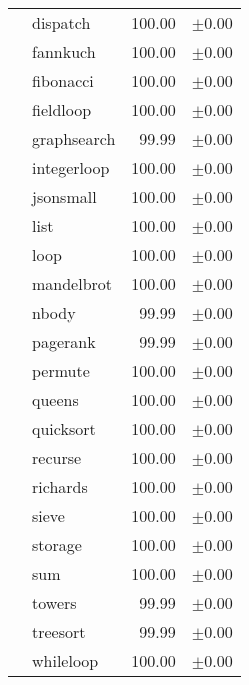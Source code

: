 \begin{tabular}{ll@{\hspace{6pt}}r@{\hspace{3pt}}l}
 & dispatch & 100.00 & \scriptsize\textcolor{gray!60}{$\pm$0.00} \\
 & fannkuch & 100.00 & \scriptsize\textcolor{gray!60}{$\pm$0.00} \\
 & fibonacci & 100.00 & \scriptsize\textcolor{gray!60}{$\pm$0.00} \\
 & fieldloop & 100.00 & \scriptsize\textcolor{gray!60}{$\pm$0.00} \\
 & graphsearch & 99.99 & \scriptsize\textcolor{gray!60}{$\pm$0.00} \\
 & integerloop & 100.00 & \scriptsize\textcolor{gray!60}{$\pm$0.00} \\
 & jsonsmall & 100.00 & \scriptsize\textcolor{gray!60}{$\pm$0.00} \\
 & list & 100.00 & \scriptsize\textcolor{gray!60}{$\pm$0.00} \\
 & loop & 100.00 & \scriptsize\textcolor{gray!60}{$\pm$0.00} \\
 & mandelbrot & 100.00 & \scriptsize\textcolor{gray!60}{$\pm$0.00} \\
 & nbody & 99.99 & \scriptsize\textcolor{gray!60}{$\pm$0.00} \\
 & pagerank & 99.99 & \scriptsize\textcolor{gray!60}{$\pm$0.00} \\
 & permute & 100.00 & \scriptsize\textcolor{gray!60}{$\pm$0.00} \\
 & queens & 100.00 & \scriptsize\textcolor{gray!60}{$\pm$0.00} \\
 & quicksort & 100.00 & \scriptsize\textcolor{gray!60}{$\pm$0.00} \\
 & recurse & 100.00 & \scriptsize\textcolor{gray!60}{$\pm$0.00} \\
 & richards & 100.00 & \scriptsize\textcolor{gray!60}{$\pm$0.00} \\
 & sieve & 100.00 & \scriptsize\textcolor{gray!60}{$\pm$0.00} \\
 & storage & 100.00 & \scriptsize\textcolor{gray!60}{$\pm$0.00} \\
 & sum & 100.00 & \scriptsize\textcolor{gray!60}{$\pm$0.00} \\
 & towers & 99.99 & \scriptsize\textcolor{gray!60}{$\pm$0.00} \\
 & treesort & 99.99 & \scriptsize\textcolor{gray!60}{$\pm$0.00} \\
 & whileloop & 100.00 & \scriptsize\textcolor{gray!60}{$\pm$0.00} \\
\bottomrule
\end{tabular}

